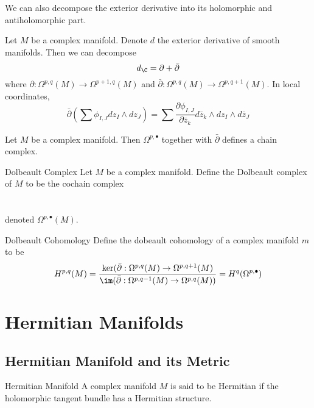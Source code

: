 \documentclass[a4paper]{article}
\begin{document}
We can also decompose the exterior derivative into its holomorphic and antiholomorphic part. 

\begin{lmm}{}{} Let $M$ be a complex manifold. Denote $d$ the exterior derivative of smooth manifolds. Then we can decompose $$d_{\C}=\partial+\bar{\partial}$$ where $\partial:\Omega^{p,q}(M)\to\Omega^{p+1,q}(M)$ and $\bar{\partial}:\Omega^{p,q}(M)\to\Omega^{p,q+1}(M)$. In local coordinates, $$\bar{\partial}\left(\sum\phi_{I,J}dz_I\wedge dz_J\right)=\sum\frac{\partial \phi_{I,J}}{\partial \bar{z}_k}d\bar{z}_k\wedge dz_I\wedge d\bar{z}_J$$
\end{lmm}

\begin{prp}{}{} Let $M$ be a complex manifold. Then $\Omega^{p,\bullet}$ together with $\bar{\partial}$ defines a chain complex. 
\end{prp}

\begin{defn}{Dolbeault Complex}{} Let $M$ be a complex manifold. Define the Dolbeault complex of $M$ to be the cochain complex \\~\\
~\\
denoted $\Omega^{p,\bullet}(M)$. 
\end{defn}

\begin{defn}{Dolbeault Cohomology}{} Define the dobeault cohomology of a complex manifold $m$ to be $$H^{p,q}(M)=\frac{\ker(\bar{\partial}:\Omega^{p,q}(M)\to\Omega^{p,q+1}(M)}{\im(\bar{\partial}:\Omega^{p,q-1}(M)\to\Omega^{p,q}(M))}=H^q(\Omega^{p,\bullet})$$
\end{defn}

\pagebreak
\section{Hermitian Manifolds}
\subsection{Hermitian Manifold and its Metric}
\begin{defn}{Hermitian Manifold}{} A complex manifold $M$ is said to be Hermitian if the holomorphic tangent bundle has a Hermitian structure. 
\end{defn}
\end{document}
